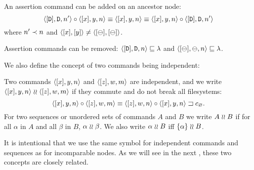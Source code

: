 \begin{myax}
An assertion command can be added on an ancestor node:
\[ \langle{[\mathtt{D}],\mathtt{D},n'}\rangle\mathbin{\circ}\langle{[x],y,n}\rangle \equiv \langle{[x],y,n}\rangle \equiv \langle{[x],y,n}\rangle\mathbin{\circ}\langle{[\mathtt{D}],\mathtt{D},n'}\rangle \]
where $n'\prec n$ and $\langle{[x],[y]}\rangle\neq\langle{[\ominus],[\ominus]}\rangle$.
\end{myax}

\begin{myax}
Assertion commands can be removed:
$\langle{[\mathtt{D}],\mathtt{D},n}\rangle\sqsubseteq\lambda$ and $\langle{[\ominus],\ominus,n}\rangle\sqsubseteq\lambda$.
\end{myax}



\bigskip


\noindent
We also define the concept of two commands being independent:

\begin{mydef}
Two commands $\langle{[x],y,n}\rangle$ and $\langle{[z],w,m}\rangle$ 
are independent, and we write $\langle{[x],y,n}\rangle\mathrel{\wr\wr}\langle{[z],w,m}\rangle$ if 
they commute and do not break all filesystems:
\[ \langle{[x],y,n}\rangle\mathbin{\circ}\langle{[z],w,m}\rangle \equiv {\langle{[z],w,n}\rangle\mathbin{\circ}\langle{[x],y,n}\rangle}\sqsupset c_\varnothing. \]
For two sequences or unordered sets of commands $A$ and $B$ we write $A\mathrel{\wr\wr} B$ if
for all $\alpha$ in $A$ and all $\beta$ in $B$, $\alpha\mathrel{\wr\wr}\beta$.
We also write $\alpha\mathrel{\wr\wr} B$ iff $\{\alpha\}\mathrel{\wr\wr} B$.
\end{mydef}

It is intentional that we use the same symbol for independent commands
and sequences as for incomparable nodes. As we will see in the next
,
these two concepts are closely related.

